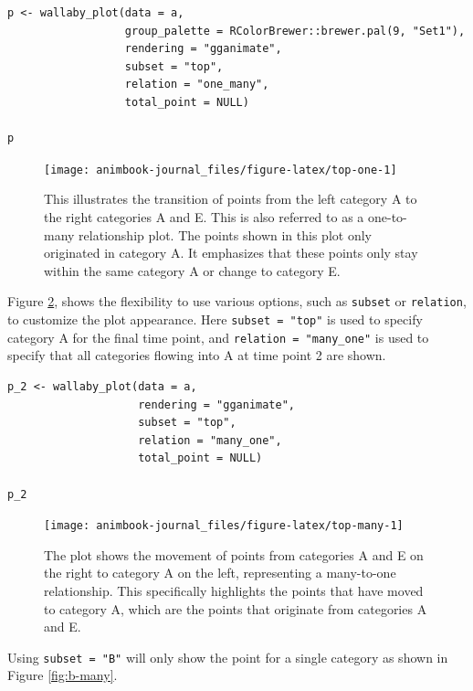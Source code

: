 \begin{verbatim}
p <- wallaby_plot(data = a,
                  group_palette = RColorBrewer::brewer.pal(9, "Set1"),
                  rendering = "gganimate",
                  subset = "top",
                  relation = "one_many",
                  total_point = NULL)

p
\end{verbatim}

\begin{figure}

{\centering \texttt{[image: animbook-journal\_files/figure-latex/top-one-1]} 

}

\caption{This illustrates the transition of points from the left category A to the right categories A and E. This is also referred to as a one-to-many relationship plot. The points shown in this plot only originated in category A. It emphasizes that these points only stay within the same category A or change to category E.}\label{fig:top-one}
\end{figure}

Figure \ref{fig:top-many}, shows the flexibility to use various options, such as \texttt{subset} or \texttt{relation}, to customize the plot appearance. Here \texttt{subset\ =\ "top"} is used to specify category A for the final time point, and \texttt{relation\ =\ "many\_one"} is used to specify that all categories flowing into A at time point 2 are shown.

\begin{verbatim}
p_2 <- wallaby_plot(data = a,
                    rendering = "gganimate",
                    subset = "top",
                    relation = "many_one",
                    total_point = NULL)

p_2
\end{verbatim}

\begin{figure}

{\centering \texttt{[image: animbook-journal\_files/figure-latex/top-many-1]} 

}

\caption{The plot shows the movement of points from categories A and E on the right to category A on the left, representing a many-to-one relationship. This specifically highlights the points that have moved to category A, which are the points that originate from categories A and E.}\label{fig:top-many}
\end{figure}

Using \texttt{subset\ =\ "B"} will only show the point for a single category as shown in Figure \ref{fig:b-many}.

